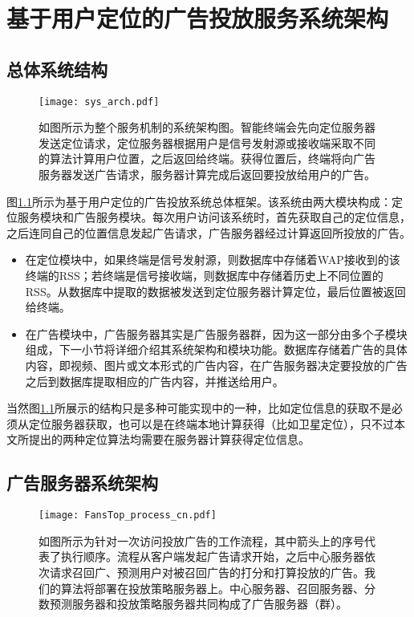 \chapter{基于用户定位的广告投放服务系统架构}
\label{cha:sys_arch}

\section{总体系统结构}

\begin{figure}[tb]
	\centering
	\texttt{[image: sys\_arch.pdf]}
	\caption{如图所示为整个服务机制的系统架构图。智能终端会先向定位服务器发送定位请求，定位服务器根据用户是信号发射源或接收端采取不同的算法计算用户位置，之后返回给终端。获得位置后，终端将向广告服务器发送广告请求，服务器计算完成后返回要投放给用户的广告。}
	\label{fig:sysarch}
\end{figure}

图\ref{fig:sysarch}所示为基于用户定位的广告投放系统总体框架。该系统由两大模块构成：定位服务模块和广告服务模块。每次用户访问该系统时，首先获取自己的定位信息，之后连同自己的位置信息发起广告请求，广告服务器经过计算返回所投放的广告。
\begin{itemize}
	\item 在定位模块中，如果终端是信号发射源，则数据库中存储着WAP接收到的该终端的RSS；若终端是信号接收端，则数据库中存储着历史上不同位置的RSS。从数据库中提取的数据被发送到定位服务器计算定位，最后位置被返回给终端。
	\item 在广告模块中，广告服务器其实是广告服务器群，因为这一部分由多个子模块组成，下一小节将详细介绍其系统架构和模块功能。数据库存储着广告的具体内容，即视频、图片或文本形式的广告内容，在广告服务器决定要投放的广告之后到数据库提取相应的广告内容，并推送给用户。
\end{itemize}

当然图\ref{fig:sysarch}所展示的结构只是多种可能实现中的一种，比如定位信息的获取不是必须从定位服务器获取，也可以是在终端本地计算获得（比如卫星定位），只不过本文所提出的两种定位算法均需要在服务器计算获得定位信息。

\section{广告服务器系统架构}

\begin{figure}[tb]
	\centering
	\texttt{[image: FansTop\_process\_cn.pdf]}
	\caption{如图所示为针对一次访问投放广告的工作流程，其中箭头上的序号代表了执行顺序。流程从客户端发起广告请求开始，之后中心服务器依次请求召回广、预测用户对被召回广告的打分和打算投放的广告。我们的算法将部署在投放策略服务器上。中心服务器、召回服务器、分数预测服务器和投放策略服务器共同构成了广告服务器（群）。}
	\label{fig:fssys}
\end{figure}

